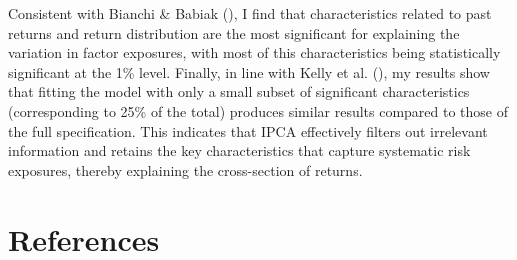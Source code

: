 \documentclass[
  12pt,
  a4paper,
  openany]{scrbook}
\begin{document}
Consistent with Bianchi \& Babiak
(), I find
that characteristics related to past returns and return distribution are
the most significant for explaining the variation in factor exposures,
with most of this characteristics being statistically significant at the
1\% level. Finally, in line with Kelly et al.
(), my results show that
fitting the model with only a small subset of significant
characteristics (corresponding to 25\% of the total) produces similar
results compared to those of the full specification. This indicates that
IPCA effectively filters out irrelevant information and retains the key
characteristics that capture systematic risk exposures, thereby
explaining the cross-section of returns.


\chapter*{References}\label{references}

\end{document}
